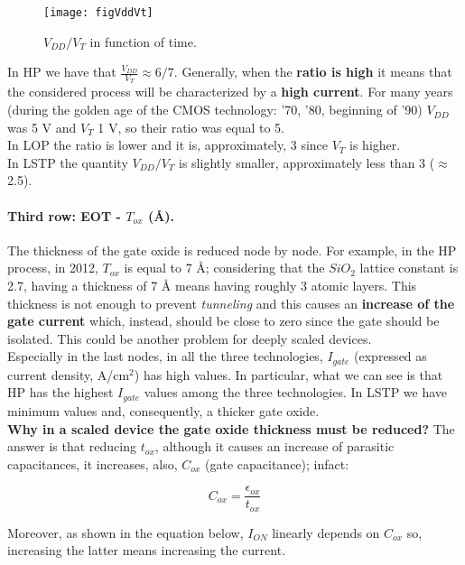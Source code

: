 \documentclass[a4paper, 12pt, twoside, openright]{report}
\begin{document}
	\begin{figure}[H]
	\centering
	\texttt{[image: figVddVt]}
	\caption{$V_{DD}/V_{T}$ in function of time.}
	\label{tau}
	\end{figure}

In HP we have that $\frac{V_{DD}}{V_{T}} \approx 6/7$. Generally, when the \textbf{ratio is high} it means that the considered process will be characterized by a \textbf{high current}. For many years (during the golden age of the CMOS technology: '70, '80, beginning of '90) $V_{DD}$ was 5 V and $V_{T}$ 1 V, so their ratio was equal to 5.\\
In LOP the ratio is lower and it is, approximately, 3 since $V_{T}$ is higher.\\
In LSTP the quantity $V_{DD}/V_{T}$ is slightly smaller, approximately less than 3 ($\approx$ 2.5).

\paragraph{Third row: EOT - $T_{ox}$ (\r{A}).} The thickness of the gate oxide is reduced node by node. For example, in the HP process, in 2012, $T_{ox}$ is equal to 7 \r{A}; considering that the $SiO_{2}$ lattice constant is 2.7, having a thickness of 7 \r{A} means having roughly 3 atomic layers. This thickness is not enough to prevent \emph{tunneling} and this causes an \textbf{increase of the gate current} which, instead, should be close to zero since the gate should be isolated. This could be another problem for deeply scaled devices.\\
Especially in the last nodes, in all the three technologies, $I_{gate}$ (expressed as current density, A/cm$^{2}$) has high values. In particular, what we can see is that HP has the highest $I_{gate}$ values among the three technologies. In LSTP we have minimum values and, consequently, a thicker gate oxide.\\
\textbf{Why in a scaled device the gate oxide thickness must be reduced?} The answer is that reducing $t_{ox}$, although it causes an increase of parasitic capacitances, it increases, also, $C_{ox}$ (gate capacitance); infact:

\begin{equation}
C_{ox} = \frac{\epsilon_{ox}}{t_{ox}}
\label{}
\end{equation}

Moreover, as shown in the equation below, $I_{ON}$ linearly depends on $C_{ox}$ so, increasing the latter means increasing the current.
\end{document}
